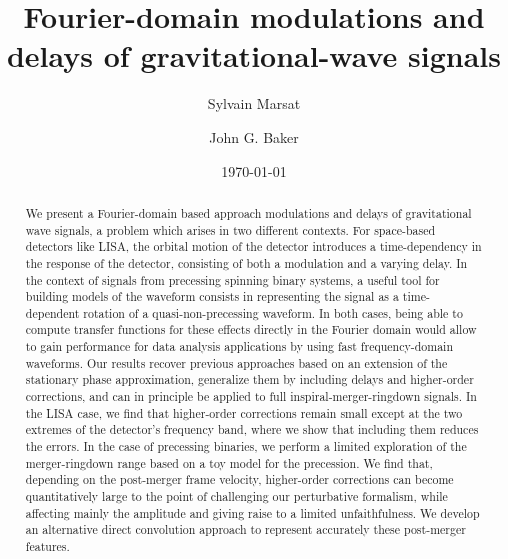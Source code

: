 \documentclass[aps,showpacs,twocolumn,
prd,superscriptaddress,nofootinbib]{revtex4-1}
\begin{document}
\title{Fourier-domain modulations and delays of gravitational-wave signals}

\author{Sylvain Marsat}
\author{John G. Baker}


\date{\today}

\begin{abstract}

We present a Fourier-domain based approach modulations and delays of gravitational wave signals, a problem which arises in two different contexts. For space-based detectors like LISA, the orbital motion of the detector introduces a time-dependency in the response of the detector, consisting of both a modulation and a varying delay. In the context of signals from precessing spinning binary systems, a useful tool for building models of the waveform consists in representing the signal as a time-dependent rotation of a quasi-non-precessing waveform. In both cases, being able to compute transfer functions for these effects directly in the Fourier domain would allow to gain performance for data analysis applications by using fast frequency-domain waveforms. Our results recover previous approaches based on an extension of the stationary phase approximation, generalize them by including delays and higher-order corrections, and can in principle be applied to full inspiral-merger-ringdown signals. In the LISA case, we find that higher-order corrections remain small except at the two extremes of the detector's frequency band, where we show that including them reduces the errors. In the case of precessing binaries, we perform a limited exploration of the merger-ringdown range based on a toy model for the precession. We find that, depending on the post-merger frame velocity, higher-order corrections can become quantitatively large to the point of challenging our perturbative formalism, while affecting mainly the amplitude and giving raise to a limited unfaithfulness. We develop an alternative direct convolution approach to represent accurately these post-merger features.

\end{abstract}

\end{document}
